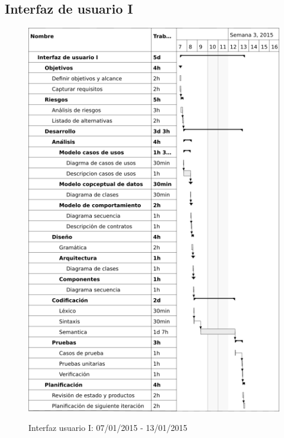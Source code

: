 \subsection{Interfaz de usuario I}
\begin{center}
\begin{figure}[H]
\centering
\includegraphics[scale=1]{planning/8-interfaz-usuario-i.png} \\
\caption{Interfaz usuario I: 07/01/2015 - 13/01/2015 }
\end{figure}
\end{center}


